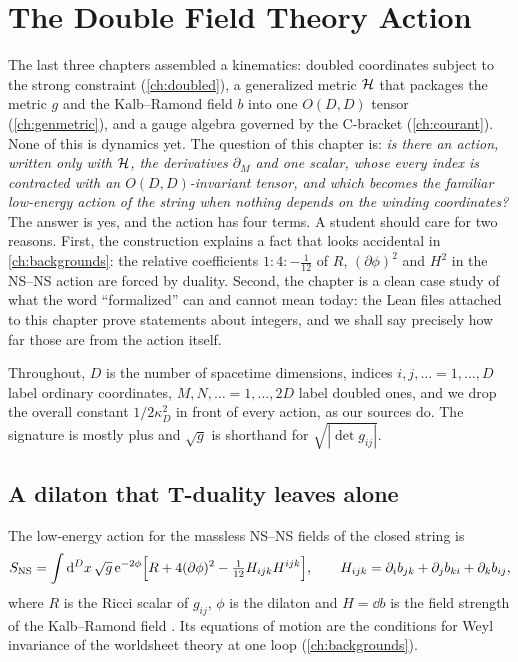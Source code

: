 \chapter{The Double Field Theory Action}\label{ch:dftaction}

The last three chapters assembled a kinematics: doubled coordinates subject to the strong
constraint (\cref{ch:doubled}), a generalized metric $\mathcal{H}$ that packages the metric $g$ and
the Kalb--Ramond field $b$ into one $O(D,D)$ tensor (\cref{ch:genmetric}), and a gauge algebra
governed by the C-bracket (\cref{ch:courant}). None of this is dynamics yet. The question of
this chapter is: \emph{is there an action, written only with $\mathcal{H}$, the derivatives
$\partial_M$ and one scalar, whose every index is contracted with an $O(D,D)$-invariant
tensor, and which becomes the familiar low-energy action of the string when nothing depends
on the winding coordinates?} The answer is yes, and the action has four terms. A student
should care for two reasons. First, the construction explains a fact that looks accidental
in \cref{ch:backgrounds}: the relative coefficients $1:4:-\tfrac1{12}$ of $R$,
$(\partial\phi)^2$ and $H^2$ in the NS--NS action are forced by duality.
Second, the chapter is a clean case study of what the word ``formalized'' can and cannot mean
today: the Lean files attached to this chapter prove statements about integers, and we shall
say precisely how far those are from the action itself.

Throughout, $D$ is the number of spacetime dimensions, indices $i,j,\dots=1,\dots,D$ label
ordinary coordinates, $M,N,\dots=1,\dots,2D$ label doubled ones, and we drop the overall
constant $1/2\kappa_D^2$ in front of every action, as our sources do. The signature is mostly
plus and $\sqrt g$ is shorthand for $\sqrt{|\det g_{ij}|}$.

\section{A dilaton that T-duality leaves alone}\label{sec:dftaction:dilaton}

The low-energy action for the massless NS--NS fields of the closed string is
\begin{equation}\label{eq:dftaction:nsns}
S_{\text{NS}}=\int\mathrm{d}^Dx\,\sqrt g\,\mathrm{e}^{-2\phi}\Bigl[R+4(\partial\phi)^2-\tfrac1{12}H_{ijk}H^{ijk}
\Bigr],\qquad H_{ijk}=\partial_ib_{jk}+\partial_jb_{ki}+\partial_kb_{ij},
\end{equation}
where $R$ is the Ricci scalar of $g_{ij}$, $\phi$ is the dilaton and $H=\dd b$
is the field strength of the Kalb--Ramond field
. Its
equations of motion are the conditions for Weyl invariance of the worldsheet theory at one
loop (\cref{ch:backgrounds}).

